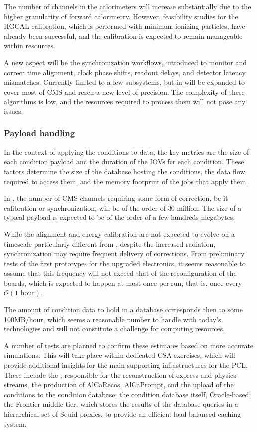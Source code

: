 The number of channels in the calorimeters will increase substantially due to the higher granularity of forward calorimetry. However, feasibility studies for the \gls{HGCAL} calibration, which is performed with minimum-ionizing particles, have already been successful, and the calibration is expected to remain manageable within \PhaseTwo resources.

A new aspect will be the synchronization workflows, introduced to monitor and correct time alignment, clock phase shifts, readout delays, and detector latency mismatches. Currently limited to a few subsystems, but in \PhaseTwo will be expanded to cover most of CMS and reach a new level of precision. The complexity of these algorithms is low, and the resources required to process them will not pose any issues.

\subsubsection{Payload handling}

In the context of applying the conditions to data, the key metrics are the size of each condition payload and the duration of the IOVs for each condition. These factors determine the size of the database hosting the conditions, the data flow required to access them, and the memory footprint of the jobs that apply them.

In \PhaseTwo, the number of CMS channels requiring some form of correction, be it calibration or synchronization, will be of the order of 30 million. The size of a typical payload is expected to be of the order of a few hundreds megabytes.

While the alignment and energy calibration are not expected to evolve on a timescale particularly different from \PhaseOne, despite the increased radiation, synchronization may require frequent delivery of corrections. From preliminary tests of the first prototypes for the upgraded electronics, it seems reasonable to assume that this frequency will not exceed that of the reconfiguration of the boards, which is expected to happen at most once per run, that is, once every $\mathcal{O}(\text{1 hour})$.

The amount of condition data to hold in a database corresponds then to some 100\unit{MB/hour}, which seems a reasonable number to handle with today’s technologies and will not constitute a challenge for \PhaseTwo computing resources.

A number of tests are planned to confirm these estimates based on more accurate simulations. This will take place within dedicated \gls{CSA} exercises, which will provide additional insights for the main supporting infrastructures for the \gls{PCL}. These include the \TierZero, responsible for the reconstruction of express and physics streams, the production of AlCaRecos, AlCaPrompt, and the upload of the conditions to the condition database; the condition database itself, Oracle-based; the Frontier middle tier, which stores the results of the database queries in a hierarchical set of Squid proxies, to provide an efficient load-balanced caching system.

